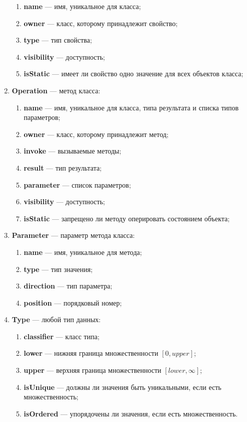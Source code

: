 \begin{enumerate}
\begin{enumerate}
    \item \textbf{name} --- имя, уникальное для класса;
    \item \textbf{owner} --- класс, которому принадлежит свойство;
    \item \textbf{type} --- тип свойства;
    \item \textbf{visibility} --- доступность;
    \item \textbf{isStatic} --- имеет ли свойство одно значение для всех объектов класса;
    \end{enumerate}
\item \textbf{Operation} --- метод класса:
    \begin{enumerate}
    \item \textbf{name} --- имя, уникальное для класса, типа результата и списка типов параметров;
    \item \textbf{owner} --- класс, которому принадлежит метод;
    \item \textbf{invoke} --- вызываемые методы;
    \item \textbf{result} --- тип результата;
    \item \textbf{parameter} --- список параметров;
    \item \textbf{visibility} --- доступность;
    \item \textbf{isStatic} --- запрещено ли методу оперировать состоянием объекта;
    \end{enumerate}
\item \textbf{Parameter} --- параметр метода класса:
    \begin{enumerate}
    \item \textbf{name} --- имя, уникальное для метода;
    \item \textbf{type} --- тип значения;
    \item \textbf{direction} --- тип параметра;
    \item \textbf{position} --- порядковый номер;
    \end{enumerate}
\item \textbf{Type} --- любой тип данных:
    \begin{enumerate}
    \item \textbf{classifier} --- класс типа;
    \item \textbf{lower} --- нижняя граница множественности $\left [ 0, upper \right ]$;
    \item \textbf{upper} --- верхняя граница множественности $\left [ lower, \infty \right ]$;
    \item \textbf{isUnique} --- должны ли значения быть уникальными, если есть множественность;
    \item \textbf{isOrdered} --- упорядочены ли значения, если есть множественность.
    \end{enumerate}
\end{enumerate}

